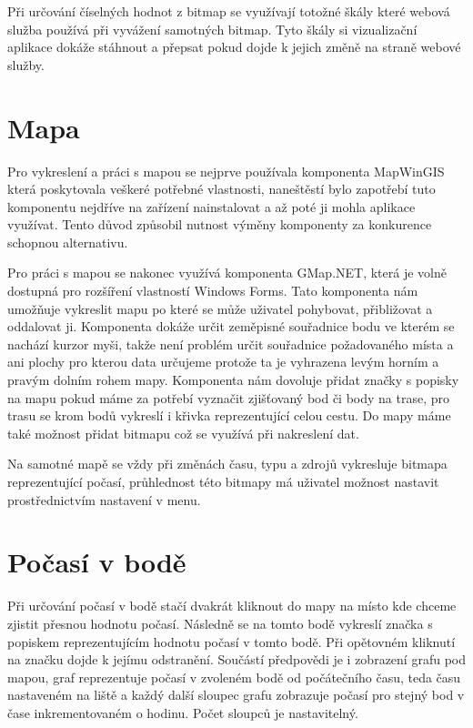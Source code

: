 \documentclass[czech,bachelor,dept460,male,csharp,cpdeclaration]{diploma}
\begin{document}
	Při určování číselných hodnot z bitmap se využívají totožné škály které webová služba používá při vyvážení samotných bitmap. Tyto škály si vizualizační aplikace dokáže stáhnout a přepsat pokud dojde k jejich změně na straně webové služby.
	
	\section{Mapa}
	
	Pro vykreslení a práci s mapou se nejprve používala komponenta MapWinGIS která poskytovala veškeré potřebné vlastnosti, naneštěstí bylo zapotřebí tuto komponentu nejdříve na zařízení nainstalovat a až poté ji mohla aplikace využívat. Tento důvod způsobil nutnost výměny komponenty za konkurence schopnou alternativu.
	
	Pro práci s mapou se nakonec využívá komponenta GMap.NET, která je volně dostupná pro rozšíření vlastností Windows Forms. Tato komponenta nám umožňuje vykreslit mapu po které se může uživatel pohybovat, přibližovat a oddalovat ji. Komponenta dokáže určit zeměpisné souřadnice bodu ve kterém se nachází kurzor myši, takže není problém určit souřadnice požadovaného místa a ani plochy pro kterou data určujeme protože ta je vyhrazena levým horním a pravým dolním rohem mapy. Komponenta nám dovoluje přidat značky s popisky na mapu pokud máme za potřebí vyznačit zjišťovaný bod či body na trase, pro trasu se krom bodů vykreslí i křivka reprezentující celou cestu. Do mapy máme také možnost přidat bitmapu což se využívá při nakreslení dat.
	
	Na samotné mapě se vždy při změnách času, typu a zdrojů vykresluje bitmapa reprezentující počasí, průhlednost této bitmapy má uživatel možnost nastavit prostřednictvím nastavení v menu.
	
	\section{Počasí v bodě}
	
	Při určování počasí v bodě stačí dvakrát kliknout do mapy na místo kde chceme zjistit přesnou hodnotu počasí. Následně se na tomto bodě vykreslí značka s popiskem reprezentujícím hodnotu počasí v tomto bodě. Při opětovném kliknutí na značku dojde k jejímu odstranění. Součástí předpovědi je i zobrazení grafu pod mapou, graf reprezentuje počasí v zvoleném bodě od počátečního času, teda času nastaveném na liště a každý další sloupec grafu zobrazuje počasí pro stejný bod v čase inkrementovaném o hodinu. Počet sloupců je nastavitelný.
	
\end{document}
